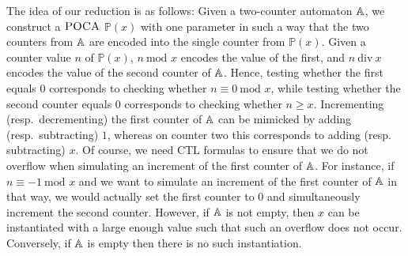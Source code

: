 \documentclass[times,envcountsame]{llncs}
\renewcommand{\mod}{\text{mod }}
\def\div{{\mathrm{div}}}
\newcommand{\add}[1]{\ensuremath{\mathsf{add}(#1)}}
\newcommand{\zero}{\ensuremath{\mathsf{zero}}}
\newcommand{\poca}{\textsc{POCA} }
\newcommand{\Poca}{\mathbb{P}}
\newcommand{\ctl}{\text{CTL}}
\begin{document}


The idea of our reduction is as follows: Given a two-counter automaton
$\mathbb{A}$, we construct a $\poca$ $\Poca(x)$ with one parameter in such a
way that the two counters from $\mathbb{A}$ are encoded into the single
counter from $\Poca(x)$. Given a counter value $n$ of $\Poca(x)$,
$n\ \mod x$ encodes the value of the first, and $n\ \div\ x$ encodes
the value of the second counter of $\mathbb{A}$.  Hence, testing whether the
first equals $0$ corresponds to checking whether $n\equiv 0\ \mod
x$, while testing whether the second counter equals $0$ corresponds to
checking whether $n\geq x$.  Incrementing (resp.\ decrementing) the
first counter of $\mathbb{A}$ can be mimicked by adding (resp.\ subtracting) $1$,
whereas on counter two this corresponds to adding (resp. subtracting)
$x$. Of course, we need $\ctl$ formulas to ensure that we do not
overflow when simulating an increment of the first counter of $\mathbb{A}$.
For instance, if $n\equiv -1\ \mod x$ and we want to
simulate an increment of the first counter of $\mathbb{A}$ in that way, we
would actually set the first counter to $0$ and simultaneously
increment the second counter. However, if $\mathbb{A}$ is not empty, then
$x$ can be instantiated with a large enough value such that such an
overflow does not occur. Conversely, if $\mathbb{A}$ is empty then there is
no such instantiation.  \iffalse
\end{document}
